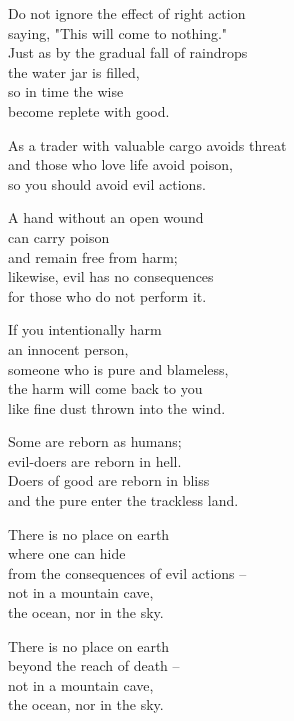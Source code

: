 Do not ignore the effect of right action\\
saying, "This will come to nothing."\\
Just as by the gradual fall of raindrops\\
the water jar is filled,\\
so in time the wise\\
become replete with good.


As a trader with valuable cargo avoids threat\\
and those who love life avoid poison,\\
so you should avoid evil actions.


A hand without an open wound\\
can carry poison\\
and remain free from harm;\\
likewise, evil has no consequences\\
for those who do not perform it.


If you intentionally harm\\
an innocent person,\\
someone who is pure and blameless,\\
the harm will come back to you\\
like fine dust thrown into the wind.


Some are reborn as humans;\\
evil-doers are reborn in hell.\\
Doers of good are reborn in bliss\\
and the pure enter the trackless land.


There is no place on earth\\
where one can hide\\
from the consequences of evil actions --\\
not in a mountain cave,\\
the ocean, nor in the sky.


There is no place on earth\\
beyond the reach of death --\\
not in a mountain cave,\\
the ocean, nor in the sky.

